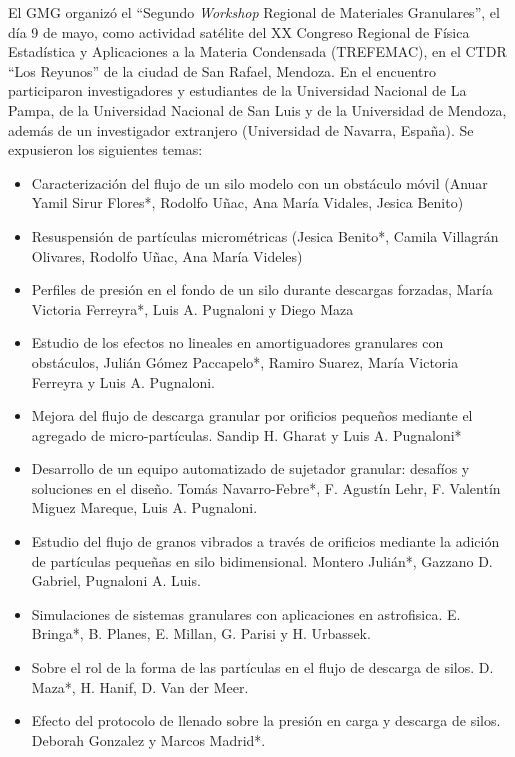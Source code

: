 \documentclass[a4paper,11pt,twoside,final,titlepage,onecolumn,openright]{report}
\begin{document}
El GMG organizó el ``Segundo \textit{Workshop} Regional de Materiales Granulares'', el día 9 de mayo, como actividad satélite del XX Congreso Regional de Física Estadística y Aplicaciones a la Materia Condensada (TREFEMAC), en el CTDR ``Los Reyunos'' de la ciudad de San Rafael, Mendoza. En el encuentro participaron investigadores y estudiantes de la Universidad Nacional de La Pampa, de la Universidad Nacional de San Luis y de la Universidad de Mendoza, además de un investigador extranjero (Universidad de Navarra, España). Se expusieron los siguientes temas:
\begin{itemize}
 \item Caracterización del flujo de un silo modelo con un obstáculo móvil (Anuar Yamil Sirur Flores*, Rodolfo Uñac, Ana María Vidales, Jesica Benito) 
 
 \item Resuspensión de partículas micrométricas (Jesica Benito*, Camila Villagrán Olivares, Rodolfo Uñac, Ana María Videles)
 
 \item Perfiles de presión en el fondo de un silo durante descargas forzadas, María Victoria Ferreyra*, Luis A. Pugnaloni y Diego Maza
 
 \item Estudio de los efectos no lineales en amortiguadores granulares con obstáculos, Julián Gómez Paccapelo*, Ramiro Suarez, María Victoria Ferreyra y Luis A. Pugnaloni.
 
 \item Mejora del flujo de descarga granular por orificios pequeños mediante el agregado de micro-partículas. Sandip H. Gharat y Luis A. Pugnaloni*
 
 \item Desarrollo de un equipo automatizado de sujetador granular: desafíos y soluciones en el diseño. Tomás Navarro-Febre*,  F. Agustín Lehr, F. Valentín Miguez Mareque, Luis A. Pugnaloni.
 
\item Estudio del flujo de granos vibrados a través de orificios mediante la adición de partículas pequeñas en silo bidimensional. Montero Julián*, Gazzano D. Gabriel, Pugnaloni A. Luis.

\item Simulaciones de sistemas granulares con aplicaciones en astrofisica. E. Bringa*, B. Planes, E. Millan, G. Parisi y H. Urbassek.

\item Sobre el rol de la forma de las partículas en el flujo de descarga de silos. D. Maza*, H. Hanif, D. Van der Meer.

\item Efecto del protocolo de llenado sobre la presión en carga y descarga de silos. Deborah Gonzalez y Marcos Madrid*.
\end{itemize}
\end{document}
